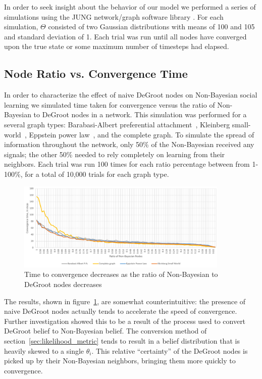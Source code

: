 \documentclass[letterpaper, 10pt, conference]{ieeeconf}
\begin{document}
In order to seek insight about the behavior of our model we performed a series of simulations using the JUNG network/graph software library \cite{website:JUNGGraphLibrary}.  For each simulation, $\Theta$ consisted of two Gaussian distributions with means of 100 and 105 and standard deviation of 1.  Each trial was run until all nodes have converged upon the true state or some maximum number of timesteps had elapsed.

\subsection{Node Ratio vs. Convergence Time}
\label{sec:node_ratio_vs_convergence_time}

In order to characterize the effect of naive DeGroot nodes on Non-Bayesian social learning we simulated time taken for convergence versus the ratio of Non-Bayesian to DeGroot nodes in a network.  This simulation was performed for a several graph types: Barabasi-Albert preferential attachment~\cite{Barabasi}, Kleinberg small-world~\cite{KleinbergSmallWorld}, Eppstein power law~\cite{Eppstein}, and the complete graph.  To simulate the spread of information throughout the network, only 50\% of the Non-Bayesian received any signals; the other 50\% needed to rely completely on learning from their neighbors.  Each trial was run 100 times for each ratio percentage between from 1-100\%, for a total of 10,000 trials for each graph type.

\begin{figure}[t]
\centering
\includegraphics[width=0.9\textwidth]{figures/nb_ratio}
\caption{Time to convergence decreases as the ratio of Non-Bayesian to DeGroot nodes decreases}
\label{fig:nb_ratio}
\end{figure}

The results, shown in figure~\ref{fig:nb_ratio}, are somewhat counterintuitive: the presence of naive DeGroot nodes actually tends to accelerate the speed of convergence.  Further investigation showed this to be a result of the process used to convert DeGroot belief to Non-Bayesian belief.  The conversion method of section~\ref{sec:likelihood_metric} tends to result in a belief distribution that is heavily skewed to a single $\theta_i$.  This relative ``certainty'' of the DeGroot nodes is picked up by their Non-Bayesian neighbors, bringing them more quickly to convergence.
\end{document}
